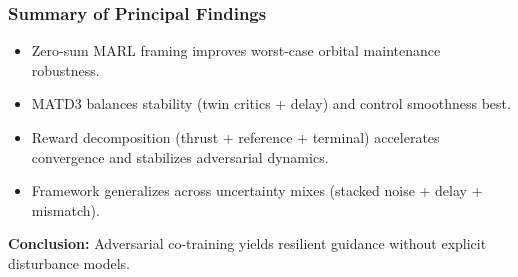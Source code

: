 \begin{frame}
  \frametitle{Summary of Principal Findings}
  \small
  \begin{itemize}\setlength{\itemsep}{5pt}
    \item Zero-sum MARL framing improves worst-case orbital maintenance robustness.
    \item MATD3 balances stability (twin critics + delay) and control smoothness best.
    \item Reward decomposition (thrust + reference + terminal) accelerates convergence and stabilizes adversarial dynamics.
    \item Framework generalizes across uncertainty mixes (stacked noise + delay + mismatch).
  \end{itemize}
  \vspace{4pt}
  \textbf{Conclusion:} Adversarial co-training yields resilient guidance without explicit disturbance models.
\end{frame}







